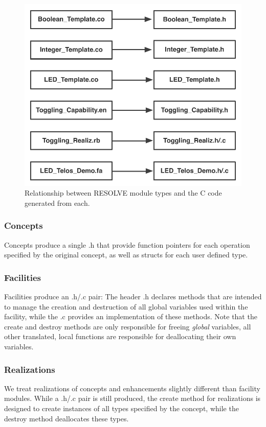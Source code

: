 \begin{figure}
\begin{center}
\includegraphics[scale=.55]{figs/relationship.pdf}
\end{center}
\caption{Relationship between RESOLVE module types and the C code generated from each.}
\label{fig:relationship}
\end{figure}

\subsubsection{Concepts}
Concepts produce a single .h that provide function pointers for each operation specified by the original concept, as well as structs for each user defined type. 

\subsubsection{Facilities}
Facilities produce an .h/.c pair: The header .h declares methods that are intended to manage the creation and destruction of all global variables used within the facility, while the .c provides an implementation of these methods.  Note that the create and destroy methods are only responsible for freeing \textit{global} variables, all other translated, local functions are responsible for deallocating their own variables. 

\subsubsection{Realizations}
We treat realizations of concepts and enhancements slightly different than facility modules. While a .h/.c pair is still produced, the create method for realizations is designed to create instances of all types specified by the concept, while the destroy method deallocates these types.

